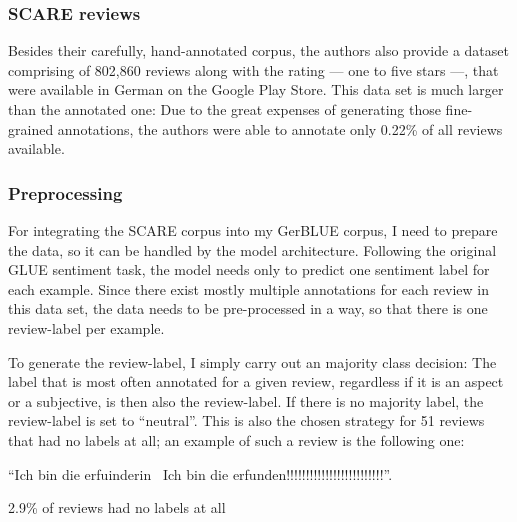 \subsubsection{SCARE reviews}

Besides their carefully, hand-annotated corpus, the authors also provide a dataset comprising of 
802,860 reviews along with the rating --- one to five stars ---, that were available in German on 
the Google Play Store.
This data set is much larger than the annotated one: Due to the great expenses of generating those 
fine-grained annotations, the authors were able to annotate only 0.22\% of all reviews available.


\subsubsection{Preprocessing}

For integrating the SCARE corpus into my GerBLUE corpus, I need to prepare the data, so it can be 
handled by the model architecture.
Following the original GLUE sentiment task, the model needs only to predict one sentiment label 
for each example.
Since there exist mostly multiple annotations for each review in this data set, the data needs to 
be pre-processed in a way, so that there is one review-label per example.

To generate the review-label, I simply carry out an majority class decision:
The label that is most often annotated for a given review, regardless if it is an aspect or a 
subjective, is then also the review-label.
If there is no majority label, the review-label is set to ``neutral''.
This is also the chosen strategy for 51 reviews that had no labels at all; an example of such a 
review is the following one: 

\begin{examples}
	\item ``Ich bin die erfuinderin \textbar \textbar\ Ich bin die erfunden!!!!!!!!!!!!!!!!!!!!!!!!!''.
\end{examples}

2.9\% of reviews had no labels at all 

